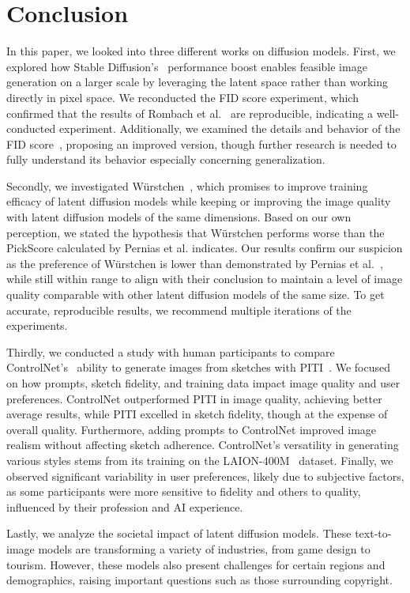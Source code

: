 \section{Conclusion}
In this paper, we looked into three different works on diffusion models. First,
we explored how Stable Diffusion's~\cite{rombach2022stablediffusion}
performance boost enables feasible image generation on a larger scale by
leveraging the latent space rather than working directly in pixel space. We
reconducted the FID score experiment, which confirmed that the results of
Rombach et al.~\cite{rombach2022stablediffusion} are reproducible, indicating a
well-conducted experiment. Additionally, we examined the details and behavior
of the FID score~\cite{heusel2018ganstrainedtimescaleupdate}, proposing an
improved version, though further research is needed to fully understand its
behavior especially concerning generalization.

Secondly, we investigated W\"urstchen~\cite{pernias2024wrstchen}, which promises
to improve training efficacy of latent diffusion models while keeping or
improving the image quality with latent diffusion models of the same dimensions.
Based on our own perception, we stated the hypothesis that W\"urstchen performs
worse than the PickScore calculated by Pernias et al. indicates.
Our results confirm our suspicion as the preference of W\"urstchen is lower
than demonstrated by Pernias et al.~\cite{pernias2024wrstchen}, while still within 
range to align with their conclusion to maintain a level of image quality comparable
with other latent diffusion models of the same size. To get accurate,
reproducible results, we recommend multiple iterations of the experiments.

Thirdly, we conducted a study with human participants to compare
ControlNet's~\cite{zhang2023addingconditionalcontroltexttoimage} ability to
generate images from sketches with
PITI~\cite{wang2022pretrainingneedimagetoimagetranslation}. We focused on how
prompts, sketch fidelity, and training data impact image quality and user
preferences. ControlNet outperformed PITI in image quality, achieving
better average results, while PITI excelled in sketch fidelity, though at the
expense of overall quality. Furthermore, adding prompts to ControlNet improved
image realism without affecting sketch adherence. ControlNet's versatility in
generating various styles stems from its training on the
LAION-400M~\cite{schuhmann2021laion400mopendatasetclipfiltered} dataset.
Finally, we observed significant variability in user preferences, likely due to
subjective factors, as some participants were more sensitive to fidelity and
others to quality, influenced by their profession and AI experience.

Lastly, we analyze the societal impact of latent diffusion models. These
text-to-image models are transforming a variety of industries, from game design
to tourism. However, these models also present challenges for certain regions
and demographics, raising important questions such as those surrounding
copyright.